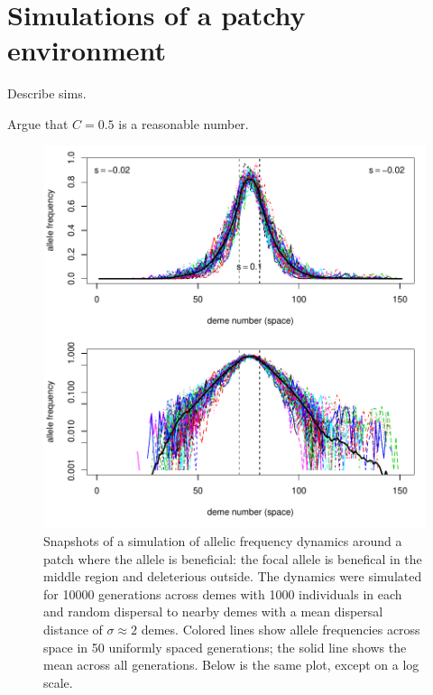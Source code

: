 \documentclass{article}
\begin{document}
\section{Simulations of a patchy environment}
\label{apx:patchy_sims}

Describe sims.

Argue that $C=0.5$ is a reasonable number.

\begin{figure}[ht!]
    \begin{center}
        \includegraphics{example-equilibrium}
    \end{center}
    \label{fig:example_equil}
    \caption{
    Snapshots of a simulation of allelic frequency dynamics around a patch where the allele is beneficial:
    the focal allele is benefical in the middle region and deleterious outside.
    The dynamics were simulated for 10000 generations across demes with 1000 individuals in each
    and random dispersal to nearby demes with a mean dispersal distance of $\sigma \approx 2$ demes.
    Colored lines show allele frequencies across space in 50 uniformly spaced generations;
    the solid line shows the mean across all generations.
    Below is the same plot, except on a log scale.
    }
\end{figure}
\end{document}
